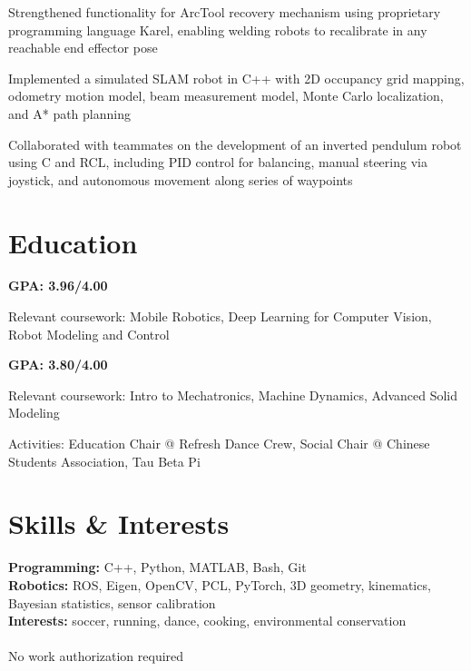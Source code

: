 \documentclass{resume}
\begin{document}
\begin{details}
\item Strengthened functionality for ArcTool recovery mechanism using proprietary
  programming language Karel, enabling welding robots to recalibrate in any reachable end
  effector pose
\end{details}

\begin{details}
\item Implemented a simulated SLAM robot in C++ with 2D occupancy grid mapping, odometry
  motion model, beam measurement model, Monte Carlo localization, and A* path planning
\item Collaborated with teammates on the development of an inverted pendulum robot using
  C and RCL, including PID control for balancing, manual steering via joystick, and
  autonomous movement along series of waypoints
\end{details}

\section{Education}

\begin{details}
\item \textbf{GPA: 3.96/4.00}
\item Relevant coursework: Mobile Robotics, Deep Learning for Computer Vision, Robot
  Modeling and Control
\end{details}

\begin{details}
\item \textbf{GPA: 3.80/4.00}
\item Relevant coursework: Intro to Mechatronics, Machine Dynamics, Advanced Solid Modeling
\item Activities: Education Chair @ Refresh Dance Crew, Social Chair @ Chinese Students
  Association, Tau Beta Pi
\end{details}

\section{Skills \& Interests}
\textbf{Programming:} C++, Python, MATLAB, Bash, Git \\
\textbf{Robotics:} ROS, Eigen, OpenCV, PCL, PyTorch, 3D geometry, kinematics, Bayesian
statistics, sensor calibration \\
\textbf{Interests:} soccer, running, dance, cooking, environmental conservation \\~\\
\textsuperscript{\textasteriskcentered}No work authorization required
\end{document}
